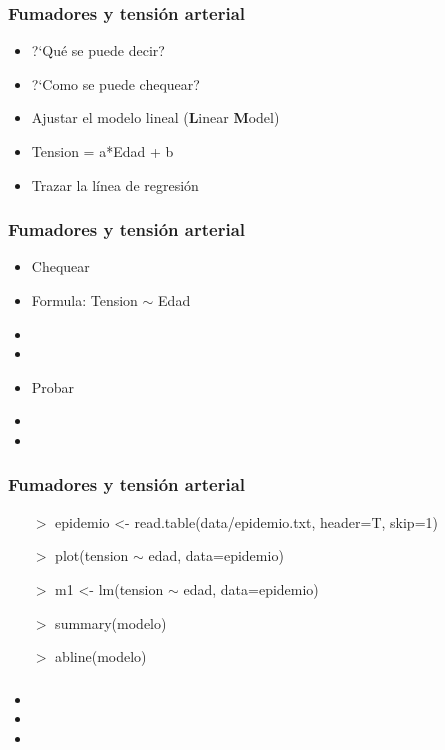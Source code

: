 \documentclass[mathserif]{beamer}
\begin{document}
\begin{frame}[plain,label=d49]%
\frametitle{Fumadores y tensi\'on arterial}
\begin{itemize}
   \item ?`Qu\'e se puede decir?
   \item ?`Como se puede chequear?
   \item Ajustar el modelo lineal (\textbf{L}inear \textbf{M}odel)
   \item Tension = a*Edad + b
   \item Trazar la l\'inea de regresi\'on
\end{itemize}
\end{frame}%

\begin{frame}[plain,label=d50]%
\frametitle{Fumadores y tensi\'on arterial}
\begin{itemize}
   \item Chequear 
   \item Formula: Tension $\sim$ Edad
   \item {}
   \item {}
   \item Probar 
   \item {}
   \item {}
\end{itemize}
\end{frame}%

\begin{frame}[plain,label=d52]%
\frametitle{Fumadores y tensi\'on arterial}
\begin{semiverbatim}
\begin{itemize}
   \item[$>$] epidemio <- read.table(data/epidemio.txt, header=T, skip=1)
   \item[$>$] plot(tension $\sim$ edad, data=epidemio)
   \item[$>$] m1 <- lm(tension $\sim$ edad, data=epidemio)
   \item[$>$] summary(modelo)
   \item[$>$] abline(modelo)
\end{itemize}
\end{semiverbatim}
\end{frame}%

\begin{frame}[plain,label=d53]%
\frametitle{}
\begin{itemize}
   \item 
   \item 
   \item 
\end{itemize}
\end{frame}%
\end{document}
